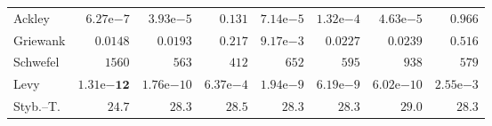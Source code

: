 \begin{tabular}{lrrrrrrr}
Ackley & $6.27\mathrm{e}{-7}$ & $3.93\mathrm{e}{-5}$ & $0.131$ & $7.14\mathrm{e}{-5}$ & $1.32\mathrm{e}{-4}$ & $4.63\mathrm{e}{-5}$ & $0.966$ \\
Griewank & $0.0148$ & $0.0193$ & $0.217$ & $9.17\mathrm{e}{-3}$ & $0.0227$ & $0.0239$ & $0.516$ \\
Schwefel & $1560$ & $563$ & $412$ & $652$ & $595$ & $938$ & $579$ \\
Levy & $\mathbf{1.31\mathrm{e}{-12}}$ & $1.76\mathrm{e}{-10}$ & $6.37\mathrm{e}{-4}$ & $1.94\mathrm{e}{-9}$ & $6.19\mathrm{e}{-9}$ & $6.02\mathrm{e}{-10}$ & $2.55\mathrm{e}{-3}$ \\
Styb.--T. & $24.7$ & $28.3$ & $28.5$ & $28.3$ & $28.3$ & $29.0$ & $28.3$ \\
\bottomrule
\end{tabular}
